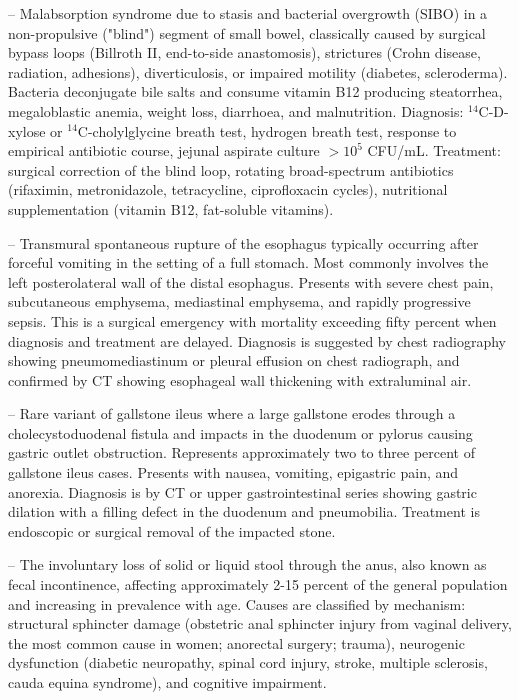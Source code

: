 -- Malabsorption syndrome due to stasis and bacterial overgrowth (SIBO) in a non-propulsive ("blind") segment of small bowel, classically caused by surgical bypass loops (Billroth II, end-to-side anastomosis), strictures (Crohn disease, radiation, adhesions), diverticulosis, or impaired motility (diabetes, scleroderma). Bacteria deconjugate bile salts and consume vitamin B12 producing steatorrhea, megaloblastic anemia, weight loss, diarrhoea, and malnutrition. Diagnosis: ${}^{14}$C-D-xylose or ${}^{14}$C-cholylglycine breath test, hydrogen breath test, response to empirical antibiotic course, jejunal aspirate culture $>10^5$ CFU/mL. Treatment: surgical correction of the blind loop, rotating broad-spectrum antibiotics (rifaximin, metronidazole, tetracycline, ciprofloxacin cycles), nutritional supplementation (vitamin B12, fat-soluble vitamins).

-- Transmural spontaneous rupture of the esophagus typically occurring after forceful vomiting in the setting of a full stomach. Most commonly involves the left posterolateral wall of the distal esophagus. Presents with severe chest pain, subcutaneous emphysema, mediastinal emphysema, and rapidly progressive sepsis. This is a surgical emergency with mortality exceeding fifty percent when diagnosis and treatment are delayed. Diagnosis is suggested by chest radiography showing pneumomediastinum or pleural effusion on chest radiograph, and confirmed by CT showing esophageal wall thickening with extraluminal air.

-- Rare variant of gallstone ileus where a large gallstone erodes through a cholecystoduodenal fistula and impacts in the duodenum or pylorus causing gastric outlet obstruction. Represents approximately two to three percent of gallstone ileus cases. Presents with nausea, vomiting, epigastric pain, and anorexia. Diagnosis is by CT or upper gastrointestinal series showing gastric dilation with a filling defect in the duodenum and pneumobilia. Treatment is endoscopic or surgical removal of the impacted stone.

-- The involuntary loss of solid or liquid stool through the anus, also known as fecal incontinence, affecting approximately 2-15 percent of the general population and increasing in prevalence with age. Causes are classified by mechanism: structural sphincter damage (obstetric anal sphincter injury from vaginal delivery, the most common cause in women; anorectal surgery; trauma), neurogenic dysfunction (diabetic neuropathy, spinal cord injury, stroke, multiple sclerosis, cauda equina syndrome), and cognitive impairment.


